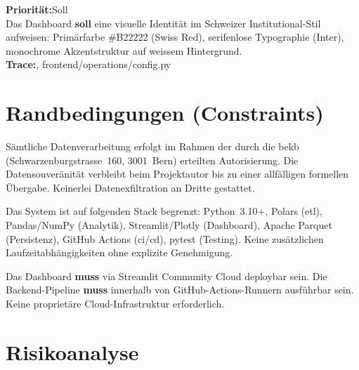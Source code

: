 \documentclass[11pt, a4paper, oneside, openany]{report}
\newcommand{\code}[1]{{\codefont\small\textcolor{DeepNavy}{#1}}}
\begin{document}
\vspace{6pt}

\begin{reqbox}
\textbf{Priorität:}\;Soll \\[4pt]
Das Dashboard \textbf{soll} eine visuelle Identität im Schweizer Institutional-Stil aufweisen: Primärfarbe \code{\#B22222} (Swiss Red), serifenlose Typographie (Inter), monochrome Akzentstruktur auf weissem Hintergrund. \\[4pt]
\textbf{Trace:}\;\code{frontend/operations/styles.py}, \code{frontend/operations/config.py}
\end{reqbox}

\section{Randbedingungen (Constraints)}
\label{sec:constraints}

\begin{constraintbox}
Sämtliche Datenverarbeitung erfolgt im Rahmen der durch die \gls{bekb} (Schwarzenburgstrasse~160, 3001~Bern) erteilten Autorisierung. Die Datensouveränität verbleibt beim Projektautor bis zu einer allfälligen formellen Übergabe. Keinerlei Datenexfiltration an Dritte gestattet.
\end{constraintbox}

\vspace{6pt}

\begin{constraintbox}
Das System ist auf folgenden Stack begrenzt: Python~3.10+, Polars (\gls{etl}), Pandas/NumPy (Analytik), Streamlit/Plotly (Dashboard), Apache Parquet (Persistenz), GitHub Actions (\gls{ci}/\gls{cd}), pytest (Testing). Keine zusätzlichen Laufzeitabhängigkeiten ohne explizite Genehmigung.
\end{constraintbox}

\vspace{6pt}

\begin{constraintbox}
Das Dashboard \textbf{muss} via Streamlit Community Cloud deploybar sein. Die Backend-Pipeline \textbf{muss} innerhalb von GitHub-Actions-Runnern ausführbar sein. Keine proprietäre Cloud-Infrastruktur erforderlich.
\end{constraintbox}

\section{Risikoanalyse}
\label{sec:risiko}
\end{document}

